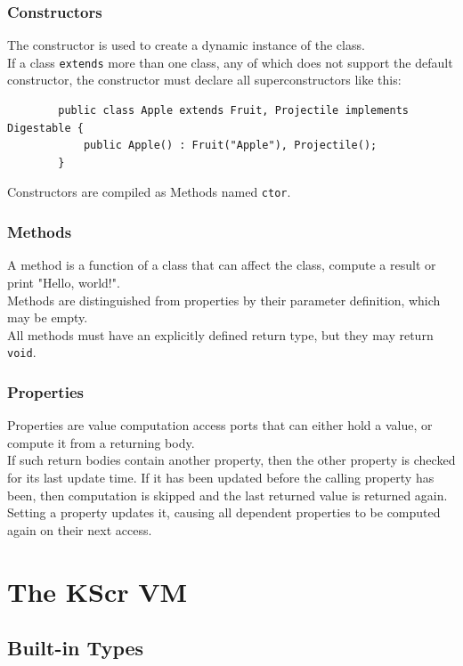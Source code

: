 \documentclass{docs}
\begin{document}
    \subsubsection{Constructors}
    The constructor is used to create a dynamic instance of the class. \\
    If a class \texttt{extends} more than one class, any of which does not support the default constructor, the constructor must declare all superconstructors like this:
    \begin{verbatim}
        public class Apple extends Fruit, Projectile implements Digestable {
            public Apple() : Fruit("Apple"), Projectile();
        }
    \end{verbatim}
    Constructors are compiled as Methods named \texttt{ctor}.
    
    \subsubsection{Methods}
    A method is a function of a class that can affect the class, compute a result or print "Hello, world!". \\
    Methods are distinguished from properties by their parameter definition, which may be empty. \\
    All methods must have an explicitly defined return type, but they may return \texttt{void}.
    
    \subsubsection{Properties}
    Properties are value computation access ports that can either hold a value, or compute it from a returning body. \\
    If such return bodies contain another property, then the other property is checked for its last update time. If it has been updated before the calling property has been, then computation is skipped and the last returned value is returned again.
    Setting a property updates it, causing all dependent properties to be computed again on their next access.
    
    \pagebreak
    \section{The KScr VM}
    
    \subsection{Built-in Types}
\end{document}
